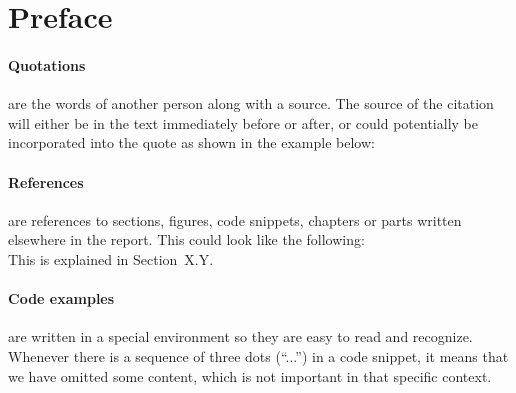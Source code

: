 
\begingroup
\let\clearpage\relax
\let\cleardoublepage\relax
\let\cleardoublepage\relax

\section*{Preface} %





\paragraph{Quotations} are the words of another person along with a source.
The source of the citation will either be in the text immediately before or after, or could potentially be incorporated into the quote as shown in the example below: \\


\paragraph{References} are references to sections, figures, code snippets, chapters or parts written elsewhere in the report. 
This could look like the following:\\

This is explained in Section~X.Y.

\paragraph{Code examples} are written in a special environment so they are easy to read and recognize. 
Whenever there is a sequence of three dots (``...'') in a code snippet, it means that we have omitted some content, which is not important in that specific context.

%



\endgroup			

\vfill
